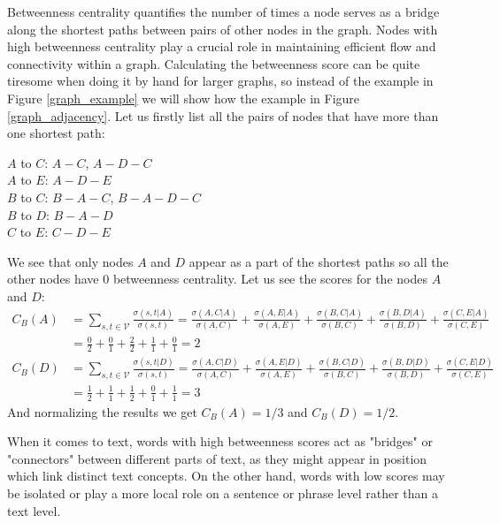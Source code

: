 \documentclass[12pt]{article}
\numberwithin{equation}{section}
\begin{document}
\begin{spacing}{1.5}
	Betweenness centrality quantifies the number of times a node serves as a bridge along the shortest paths between pairs of other nodes in the graph. Nodes with high betweenness centrality play a crucial role in maintaining efficient flow and connectivity within a graph. Calculating the betweenness score can be quite tiresome when doing it by hand for larger graphs, so instead of the example in Figure \ref{graph_example} we will show how the example in Figure \ref{graph_adjacency}. Let us firstly list all the pairs of nodes that have more than one shortest path:
	\begin{flushleft}
		$A$ to $C$: $A - C$, $A - D - C$ \\
		$A$ to $E$: $A - D - E$ \\
		$B$ to $C$: $B - A - C$, $B - A - D - C$ \\
		$B$ to $D$: $B - A - D$ \\
		$C$ to $E$: $C - D - E$ \\
	\end{flushleft}
	We see that only nodes $A$ and $D$ appear as a part of the shortest paths so all the other nodes have $0$ betweenness centrality. Let us see the scores for the nodes $A$ and $D$:
	\begin{equation*}
		\begin{split}
			C_B(A) & = \sum_{s,t \in \mathcal{V}} \frac{\sigma(s, t|A)}{\sigma(s,t)} = \frac{\sigma(A, C|A)}{\sigma(A, C)} + \frac{\sigma(A, E|A)}{\sigma(A, E)} + \frac{\sigma(B, C|A)}{\sigma(B, C)} + \frac{\sigma(B, D|A)}{\sigma(B, D)} + \frac{\sigma(C, E|A)}{\sigma(C, E)} \\
			& = \frac{0}{2} + \frac{0}{1} + \frac{2}{2} + \frac{1}{1} + \frac{0}{1} = 2 \\
			C_B(D) & = \sum_{s,t \in \mathcal{V}} \frac{\sigma(s, t|D)}{\sigma(s,t)} = \frac{\sigma(A, C|D)}{\sigma(A, C)} + \frac{\sigma(A, E|D)}{\sigma(A, E)} + \frac{\sigma(B, C|D)}{\sigma(B, C)} + \frac{\sigma(B, D|D)}{\sigma(B, D)} + \frac{\sigma(C, E|D)}{\sigma(C, E)} \\
			& = \frac{1}{2} + \frac{1}{1} + \frac{1}{2} + \frac{0}{1} + \frac{1}{1} = 3
		\end{split}
	\end{equation*}
	And normalizing the results we get $C_B(A) = 1/3$ and $C_B(D) = 1/2$.
	
	When it comes to text, words with high betweenness scores act as "bridges" or "connectors" between different parts of text, as they might appear in position which link distinct text concepts. On the other hand, words with low scores may be isolated or play a more local role on a sentence or phrase level rather than a text level.
	

\end{spacing}
\end{document}
